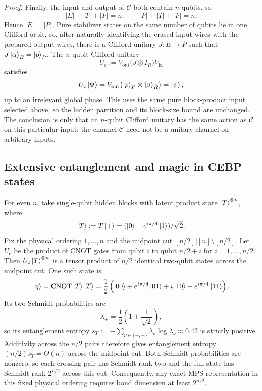 \documentclass[
  aps,
  prx,
  reprint,
  superscriptaddress,
  amsmath,
  amssymb,
  nofootinbib,
  longbibliography
]{revtex4-2}
\newcommand{\map}[1]{\mathcal{#1}}
\begin{document}
\begin{proof}
Finally, the input and output of $\map C$ both contain $n$ qubits, so
\begin{equation}
|E|+|T|+|F|=n,
\qquad
|P|+|T|+|F|=n.
\end{equation}
Hence $|E|=|P|$.  Pure stabilizer states on the same number of qubits lie in
one Clifford orbit, so, after
naturally identifying the erased input wires with the prepared output wires,
there is a Clifford unitary $J:E\to P$ such that
$J\ket{\alpha}_E=\ket{p}_P$.  The $n$-qubit Clifford unitary
\begin{equation}
U_{\mathrm c}:=V_{\mathrm{out}}
\bigl(J\otimes I_R\bigr)V_{\mathrm{in}}
\end{equation}
satisfies
\begin{equation}
U_{\mathrm c}\ket{\Psi}
=V_{\mathrm{out}}
\bigl(\ket{p}_P\otimes\ket{\beta}_R\bigr)
=\ket{\psi},
\end{equation}
up to an irrelevant global phase.  This uses the same pure block-product input
selected above, so the hidden partition and its block-size bound are unchanged.
The conclusion is only that an $n$-qubit Clifford unitary has the same action
as $\map C$ on this particular input; the channel $\map C$ need not be a
unitary channel on arbitrary inputs.
\end{proof}

\subsection{Extensive entanglement and magic in CEBP states}
\label{sec:supp-cebp-entanglement-magic}

For even $n$, take single-qubit hidden blocks with latent product state
$\ket{T}^{\otimes n}$, where
\begin{equation}
\ket{T}:=T\ket{+}=(\ket 0+e^{i\pi/4}\ket 1)/\sqrt2 .
\end{equation}
Fix the physical ordering $1,\ldots,n$ and the midpoint cut
$[n/2]|[n]\setminus[n/2]$.  Let $U_{\mathrm c}$ be the product of CNOT gates
from qubit $i$ to qubit $n/2+i$ for $i=1,\ldots,n/2$.  Then
$U_{\mathrm c}\ket{T}^{\otimes n}$ is a tensor product of $n/2$ identical
two-qubit states across the midpoint cut.  One such state is
\begin{equation}
\ket{\eta}
=\mathrm{CNOT}\ket{T}\ket{T}
=\frac{1}{2}\left(
\ket{00}+e^{i\pi/4}\ket{01}+i\ket{10}
+e^{i\pi/4}\ket{11}
\right).
\end{equation}
Its two Schmidt probabilities are
\begin{equation}
\lambda_{\pm}=\frac{1}{2}\left(1\pm\frac{1}{\sqrt2}\right),
\end{equation}
so its entanglement entropy
$s_T:=-\sum_{\nu\in\{+,-\}}\lambda_\nu\log\lambda_\nu \approx0.42$ is strictly
positive.  Additivity across the $n/2$ pairs therefore gives entanglement
entropy $(n/2)s_T=\Theta(n)$ across the midpoint cut.  Both Schmidt
probabilities are nonzero, so each crossing pair has Schmidt rank two and
the full state has Schmidt rank $2^{n/2}$ across this cut.  Consequently,
any exact MPS representation in this fixed physical ordering requires bond
dimension at least $2^{n/2}$.
\end{document}
